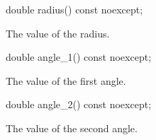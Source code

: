 \begin{itemdecl}
    double radius() const noexcept;
\end{itemdecl}
\begin{itemdescr}
	\pnum
	\returns
	The value of the radius.
\end{itemdescr}

\begin{itemdecl}
    double angle_1() const noexcept;
\end{itemdecl}
\begin{itemdescr}
	\pnum
	\returns
	The value of the first angle.
\end{itemdescr}

\begin{itemdecl}
    double angle_2() const noexcept;
\end{itemdecl}
\begin{itemdescr}
	\pnum
	\returns
	The value of the second angle.
\end{itemdescr}
